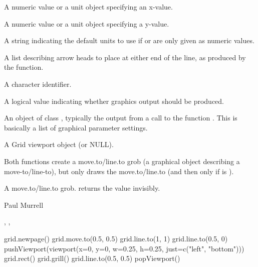 \begin{Arguments}
\begin{ldescription}
\item[\code{x}] A numeric value or a unit object specifying an x-value.
\item[\code{y}] A numeric value or a unit object specifying a y-value.
\item[\code{default.units}] A string indicating the default units to use
if  or  are only given as numeric values. 
\item[\code{arrow}] A list describing arrow heads to place at either end
of the line, as produced by the  function.
\item[\code{name}]  A character identifier. 
\item[\code{draw}] A logical value indicating whether graphics output
should be produced.
\item[\code{gp}] An object of class , typically the output
from a call to the function .  This is basically
a list of graphical parameter settings.
\item[\code{vp}] A Grid viewport object (or NULL).
\end{ldescription}
\end{Arguments}
%
\begin{Details}\relax
Both functions create a move.to/line.to grob (a graphical object describing a
move-to/line-to), but only 
draws the move.to/line.to (and then only if  is ).  
\end{Details}
%
\begin{Value}
A move.to/line.to grob.
 returns the value invisibly.
\end{Value}
%
\begin{Author}\relax
Paul Murrell
\end{Author}
%
\begin{SeeAlso}\relax
{},
,
\end{SeeAlso}
%
\begin{Examples}
\begin{ExampleCode}
grid.newpage()
grid.move.to(0.5, 0.5)
grid.line.to(1, 1)
grid.line.to(0.5, 0)
pushViewport(viewport(x=0, y=0, w=0.25, h=0.25, just=c("left", "bottom")))
grid.rect()
grid.grill()
grid.line.to(0.5, 0.5)
popViewport()
\end{ExampleCode}
\end{Examples}
